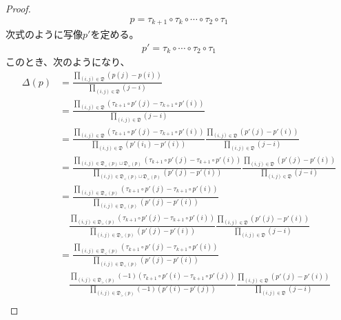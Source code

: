 \documentclass[dvipdfmx]{jsarticle}
\begin{document}
\begin{proof}
\begin{align*}
p = \tau_{k + 1} \circ \tau_{k} \circ \cdots \circ \tau_{2} \circ \tau_{1}
\end{align*}
次式のように写像$p'$を定める。
\begin{align*}
p' = \tau_{k} \circ \cdots \circ \tau_{2} \circ \tau_{1}
\end{align*}
このとき、次のようになり、
\begin{align*}
\varDelta(p) &= \frac{\prod_{(i,j)\in \mathfrak{D} } \left( p(j) - p(i) \right)}{\prod_{(i,j)\in \mathfrak{D} } (j - i)}\\
&= \frac{\prod_{(i,j)\in \mathfrak{D} } \left( \tau_{k + 1} \circ p'(j) - \tau_{k + 1} \circ p'(i) \right)}{\prod_{(i,j)\in \mathfrak{D} } (j - i)}\\
&= \frac{\prod_{(i,j)\in \mathfrak{D} } \left( \tau_{k + 1} \circ p'(j) - \tau_{k + 1} \circ p'(i) \right)}{\prod_{(i,j)\in \mathfrak{D} } \left( p'\left( i_{1} \right) - p'(i) \right)}\frac{\prod_{(i,j)\in \mathfrak{D} } \left( p'(j) - p'(i) \right)}{\prod_{(i,j)\in \mathfrak{D} } (j - i)}\\
&= \frac{\prod_{(i,j) \in \mathfrak{D}_{<}(p) \sqcup \mathfrak{D}_{>}(p) } \left( \tau_{k + 1} \circ p'(j) - \tau_{k + 1} \circ p'(i) \right)}{\prod_{(i,j) \in \mathfrak{D}_{<}(p) \sqcup \mathfrak{D}_{>}(p) } \left( p'(j) - p'(i) \right)}\frac{\prod_{(i,j)\in \mathfrak{D} } \left( p'(j) - p'(i) \right)}{\prod_{(i,j)\in \mathfrak{D} } (j - i)}\\
&= \frac{\prod_{(i,j) \in \mathfrak{D}_{<}(p) } \left( \tau_{k + 1} \circ p'(j) - \tau_{k + 1} \circ p'(i) \right)}{\prod_{(i,j) \in \mathfrak{D}_{<}(p) } \left( p'(j) - p'(i) \right)} \\
&\quad \frac{\prod_{(i,j) \in \mathfrak{D}_{>}(p) } \left( \tau_{k + 1} \circ p'(j) - \tau_{k + 1} \circ p'(i) \right)}{\prod_{(i,j) \in \mathfrak{D}_{>}(p) } \left( p'(j) - p'(i) \right)}\frac{\prod_{(i,j)\in \mathfrak{D} } \left( p'(j) - p'(i) \right)}{\prod_{(i,j)\in \mathfrak{D} } (j - i)}\\
&= \frac{\prod_{(i,j) \in \mathfrak{D}_{<}(p) } \left( \tau_{k + 1} \circ p'(j) - \tau_{k + 1} \circ p'(i) \right)}{\prod_{(i,j) \in \mathfrak{D}_{<}(p) } \left( p'(j) - p'(i) \right)} \\
&\quad \frac{\prod_{(i,j) \in \mathfrak{D}_{>}(p) } {( - 1)\left( \tau_{k + 1} \circ p'(i) - \tau_{k + 1} \circ p'(j) \right)}}{\prod_{(i,j) \in \mathfrak{D}_{>}(p) } {( - 1)\left( p'(i) - p'(j) \right)}}\frac{\prod_{(i,j)\in \mathfrak{D} } \left( p'(j) - p'(i) \right)}{\prod_{(i,j)\in \mathfrak{D} } (j - i)}\\

\end{align*}
\end{proof}
\end{document}
